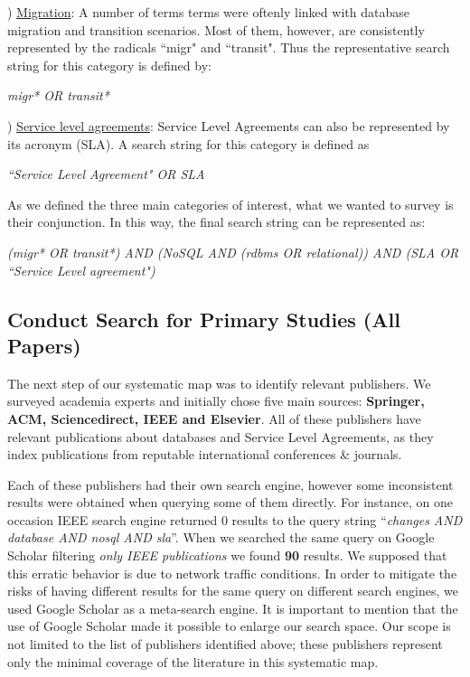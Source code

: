 \documentclass[conference, 10pt, a4paper]{IEEEtran}
\begin{document}
) \underline{Migration}: A number of terms terms were oftenly linked with database migration and transition scenarios. Most of them, however, are consistently represented by the radicals ``migr" and ``transit". Thus the representative search string for this category is defined by: 


\begin{center}
\textit{migr* OR transit*}
\end{center}


) \underline{Service level agreements}: Service Level Agreements can also be represented by its acronym (SLA). 
A search string for this category is defined as 
\begin{center}
\textit{``Service Level Agreement" OR SLA}
\end{center}

As we defined the three main categories of interest, what we wanted to survey is their conjunction. 
In this way, the final search string can be represented as: 

\begin{center}
\textit{(migr* OR transit*) AND (NoSQL AND (rdbms OR relational)) AND (SLA OR ``Service Level agreement") 
}\end{center}

\subsection{Conduct Search for Primary Studies (All Papers)}
\label{sec:allPapers}

The next step of our systematic map was to identify relevant publishers. We surveyed academia experts and initially chose five main sources: \textbf{Springer, ACM, Sciencedirect, IEEE and Elsevier}. 
All of these publishers have relevant publications about databases and Service Level Agreements, as they index publications from reputable international conferences \& journals.  

Each of these publishers had their own search engine, however some inconsistent results were obtained when querying some of them directly.
For instance, on one occasion IEEE search engine returned 0 results to the query string ``\textit{changes AND database AND nosql AND sla}''. 
When we searched the same query on Google Scholar filtering \textit{only IEEE publications} we found \textbf{90} results.
We supposed that this erratic behavior is due to network traffic conditions.
In order to mitigate the risks of having different results for the same query on different search engines, we used Google Scholar as a meta-search engine. 
It is important to mention that the use of Google Scholar made it possible to enlarge our search space.
Our scope is not limited to the list of publishers identified above; these publishers represent only the minimal coverage of the literature in this systematic map.
\end{document}
